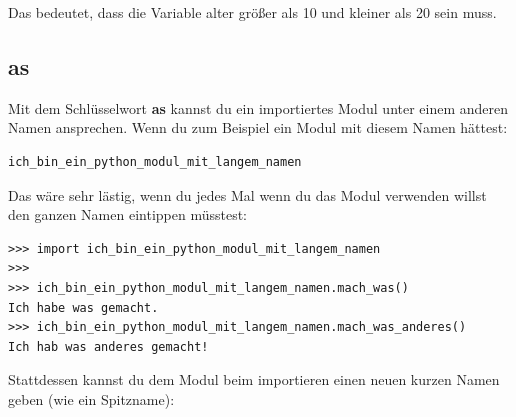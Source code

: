 \noindent
Das bedeutet, dass die Variable alter größer als 10 und kleiner als 20 sein muss.

\subsection*{as}

Mit dem Schlüsselwort \textbf{as} kannst du ein importiertes Modul unter einem anderen Namen ansprechen. Wenn du zum Beispiel ein Modul mit diesem Namen hättest:

\begin{Verbatim}[frame=single]
ich_bin_ein_python_modul_mit_langem_namen
\end{Verbatim}

\noindent
Das wäre sehr lästig, wenn du jedes Mal wenn du das Modul verwenden willst den ganzen Namen eintippen müsstest:

\begin{Verbatim}[frame=single]
>>> import ich_bin_ein_python_modul_mit_langem_namen
>>>
>>> ich_bin_ein_python_modul_mit_langem_namen.mach_was()
Ich habe was gemacht.
>>> ich_bin_ein_python_modul_mit_langem_namen.mach_was_anderes()
Ich hab was anderes gemacht!
\end{Verbatim}

\noindent
Stattdessen kannst du dem Modul beim importieren einen neuen kurzen Namen geben (wie ein Spitzname):

